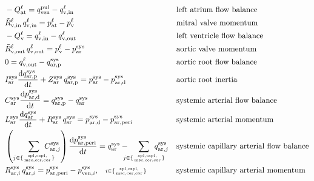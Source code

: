 \documentclass[a4paper,12pt]{report}
\begin{document}
\begin{equation}
\label{equation-syspulcap-1}
\begin{aligned}
&-Q_{\mathrm{at}}^{\ell} = q_{\mathrm{ven}}^{\mathrm{pul}} - q_{\mathrm{v,in}}^{\ell} && \text{left atrium flow balance}\nonumber\\
&\tilde{R}_{\mathrm{v,in}}^{\ell}\,q_{\mathrm{v,in}}^{\ell} = p_{\mathrm{at}}^{\ell}-p_{\mathrm{v}}^{\ell} && \text{mitral valve momentum}\nonumber\\
&-Q_{\mathrm{v}}^{\ell} = q_{\mathrm{v,in}}^{\ell} - q_{\mathrm{v,out}}^{\ell} && \text{left ventricle flow balance}\nonumber\\
&\tilde{R}_{\mathrm{v,out}}^{\ell}\,q_{\mathrm{v,out}}^{\ell} = p_{\mathrm{v}}^{\ell}-p_{\mathrm{ar}}^{\mathrm{sys}} && \text{aortic valve momentum}\nonumber\\
&0 = q_{\mathrm{v,out}}^{\ell} - q_{\mathrm{ar,p}}^{\mathrm{sys}} && \text{aortic root flow balance}\nonumber\\
&I_{\mathrm{ar}}^{\mathrm{sys}} \frac{\mathrm{d}q_{\mathrm{ar,p}}^{\mathrm{sys}}}{\mathrm{d}t} + Z_{\mathrm{ar}}^{\mathrm{sys}}\,q_{\mathrm{ar,p}}^{\mathrm{sys}}=p_{\mathrm{ar}}^{\mathrm{sys}}-p_{\mathrm{ar,d}}^{\mathrm{sys}} && \text{aortic root inertia}\nonumber\\
&C_{\mathrm{ar}}^{\mathrm{sys}} \frac{\mathrm{d}p_{\mathrm{ar,d}}^{\mathrm{sys}}}{\mathrm{d}t} = q_{\mathrm{ar,p}}^{\mathrm{sys}} - q_{\mathrm{ar}}^{\mathrm{sys}} && \text{systemic arterial flow balance}\nonumber\\
&L_{\mathrm{ar}}^{\mathrm{sys}}\frac{\mathrm{d}q_{\mathrm{ar}}^{\mathrm{sys}}}{\mathrm{d}t} + R_{\mathrm{ar}}^{\mathrm{sys}}\,q_{\mathrm{ar}}^{\mathrm{sys}}=p_{\mathrm{ar,d}}^{\mathrm{sys}} -p_{\mathrm{ar,peri}}^{\mathrm{sys}} && \text{systemic arterial momentum}\nonumber\\
&\left(\sum_{j\in\{\mathrm{spl,espl,\atop msc,cer,cor}\}}\!\!\!\!\!\!\!\!\!C_{\mathrm{ar},j}^{\mathrm{sys}}\right) \frac{\mathrm{d}p_{\mathrm{ar,peri}}^{\mathrm{sys}}}{\mathrm{d}t} = q_{\mathrm{ar}}^{\mathrm{sys}}-\!\!\!\!\!\sum_{j\in\{\mathrm{spl,espl,\atop msc,cer,cor}\}}\!\!\!\!\!\!\!\!\!q_{\mathrm{ar},j}^{\mathrm{sys}} && \text{systemic capillary arterial flow balance}\nonumber\\
&R_{\mathrm{ar},i}^{\mathrm{sys}}\,q_{\mathrm{ar},i}^{\mathrm{sys}} = p_{\mathrm{ar,peri}}^{\mathrm{sys}} - p_{\mathrm{ven},i}^{\mathrm{sys}}, \quad\scriptstyle{i\in\{\mathrm{spl,espl,\atop msc,cer,cor}\}} && \text{systemic capillary arterial momentum}\nonumber\\

\end{aligned}
\end{equation}
\end{document}
